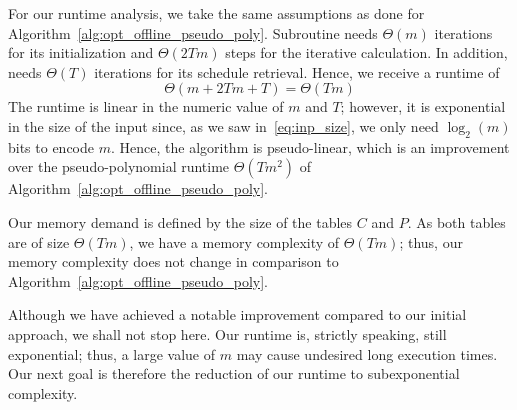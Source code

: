For our runtime analysis, we take the same assumptions as done for Algorithm~\ref{alg:opt_offline_pseudo_poly}. Subroutine  needs $\Theta(m)$ iterations for its initialization and $\Theta(2Tm)$ steps for the iterative calculation. In addition,  needs $\Theta(T)$ iterations for its schedule retrieval. Hence, we receive a runtime of 
\begin{equation*}
	\Theta(m+2Tm+T)=\Theta(Tm)
\end{equation*}
The runtime is linear in the numeric value of $m$ and $T$; however, it is exponential in the size of the input since, as we saw in~\eqref{eq:inp_size}, we only need $\log_2(m)$ bits to encode $m$. Hence, the algorithm is pseudo-linear, which is an improvement over the pseudo-polynomial runtime $\Theta(Tm^2)$ of Algorithm~\ref{alg:opt_offline_pseudo_poly}.

Our memory demand is defined by the size of the tables $C$ and $P$. As both tables are of size $\Theta(Tm)$, we have a memory complexity of $\Theta(Tm)$; thus, our memory complexity does not change in comparison to Algorithm~\ref{alg:opt_offline_pseudo_poly}.

Although we have achieved a notable improvement compared to our initial approach, we shall not stop here. Our runtime is, strictly speaking, still exponential; thus, a large value of $m$ may cause undesired long execution times. Our next goal is therefore the reduction of our runtime to subexponential complexity.
